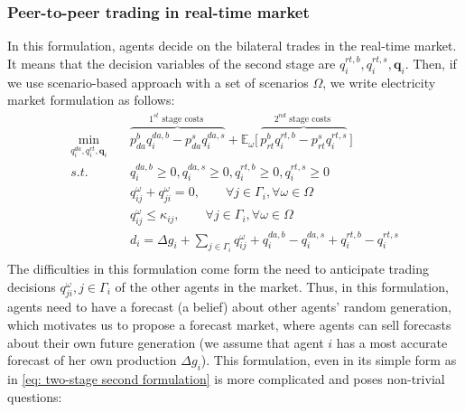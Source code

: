 \documentclass{article}
\begin{document}
\subsubsection{Peer-to-peer trading in real-time market}
In this formulation, agents decide on the bilateral trades in the real-time market. It means that the decision variables of the second stage are $q^{rt,b}_i, q^{rt,s}_i, \mathbf{q}_i$. Then, if we use scenario-based approach with a set of scenarios $\Omega$, we write electricity market formulation as follows:
\begin{equation}\label{eq: two-stage second formulation}
    \begin{aligned}
        \min_{q^{da}_i, q^{rt}_i, \mathbf{q}_{i}} \quad &  \overbrace{p^b_{da} q^{da,b}_i - p^s_{da} q^{da,s}_i}^{1^{st} \text{ stage costs }} + \mathbb{E}_{\omega}\Big[\,\overbrace{p^b_{rt} q^{rt, b}_i - p^s_{rt} q^{rt,s}_i}^{2^{nd} \text{ stage costs }} \,\Big] \\
        s.t. \quad & q^{da,b}_i \geq 0, q^{da,s}_i \geq 0, q^{rt,b}_i \geq 0, q^{rt,s}_i \geq 0\\
        & q^{\omega}_{ij} + q^{\omega}_{ji} = 0, \qquad \forall j \in \Gamma_i, \forall \omega \in \Omega\\
        & q^{\omega}_{ij} \leq \kappa_{ij}, \qquad \forall j \in \Gamma_i, \forall \omega \in \Omega \\
        & d_i = \Delta g_i + \sum_{j \in \Gamma_i} q^{\omega}_{ij} + q^{da,b}_i - q^{da,s}_i + q^{rt,b}_i - q^{rt,s}_i\\
    \end{aligned}
\end{equation}
The difficulties in this formulation come form the need to anticipate trading decisions $q^{\omega}_{ji}, j \in \Gamma_i$ of the other agents in the market. Thus, in this formulation, agents need to have a forecast (a belief) about other agents' random generation, which motivates us to propose a forecast market, where agents can sell forecasts about their own future generation (we assume that agent $i$ has a most accurate forecast of her own production $\Delta g_i$). This formulation, even in its simple form as in \eqref{eq: two-stage second formulation} is more complicated and poses non-trivial questions:
\end{document}
